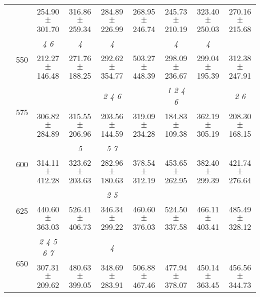 \begin{table}[h]
{\begin{tabular}{
        ccccccccc}
 & & \cellcolor[HTML]{EFEFEF} 254.90 $\pm$ 301.70& \cellcolor[HTML]{EFEFEF} 316.86 $\pm$ 259.34& \cellcolor[HTML]{EFEFEF} 284.89 $\pm$ 226.99& \cellcolor[HTML]{EFEFEF} 268.95 $\pm$ 246.74& \cellcolor[HTML]{EFEFEF} 245.73 $\pm$ 210.19& \cellcolor[HTML]{EFEFEF} 323.40 $\pm$ 250.03& \cellcolor[HTML]{EFEFEF} 270.16 $\pm$ 215.68 \\ 
 & \multirow{2}{*}{550}& \textit{ 4 6 }& \textit{ 4 }& \textit{ 4 }& & \textit{ 4 }& \textit{ 4 }&  \\ 
 & & 212.27 $\pm$ 146.48& 271.76 $\pm$ 188.25& 292.62 $\pm$ 354.77& 503.27 $\pm$ 448.39& 298.09 $\pm$ 236.67& 299.04 $\pm$ 195.39& 312.38 $\pm$ 247.91 \\ 
 & \multirow{2}{*}{575}& \cellcolor[HTML]{EFEFEF} & \cellcolor[HTML]{EFEFEF} & \cellcolor[HTML]{EFEFEF} \textit{ 2 4 6 }& \cellcolor[HTML]{EFEFEF} & \cellcolor[HTML]{EFEFEF} \textit{ 1 2 4 6 }& \cellcolor[HTML]{EFEFEF} & \cellcolor[HTML]{EFEFEF} \textit{ 2 6 } \\ 
 & & \cellcolor[HTML]{EFEFEF} 306.82 $\pm$ 284.89& \cellcolor[HTML]{EFEFEF} 315.55 $\pm$ 206.96& \cellcolor[HTML]{EFEFEF} 203.56 $\pm$ 144.59& \cellcolor[HTML]{EFEFEF} 319.09 $\pm$ 234.28& \cellcolor[HTML]{EFEFEF} 184.83 $\pm$ 109.38& \cellcolor[HTML]{EFEFEF} 362.19 $\pm$ 305.19& \cellcolor[HTML]{EFEFEF} 208.30 $\pm$ 168.15 \\ 
 & \multirow{2}{*}{600}& & \textit{ 5 }& \textit{ 5 7 }& & & &  \\ 
 & & 314.11 $\pm$ 412.28& 323.62 $\pm$ 203.63& 282.96 $\pm$ 180.63& 378.54 $\pm$ 312.19& 453.65 $\pm$ 262.95& 382.40 $\pm$ 299.39& 421.74 $\pm$ 276.64 \\ 
 & \multirow{2}{*}{625}& \cellcolor[HTML]{EFEFEF} & \cellcolor[HTML]{EFEFEF} & \cellcolor[HTML]{EFEFEF} \textit{ 2 5 }& \cellcolor[HTML]{EFEFEF} & \cellcolor[HTML]{EFEFEF} & \cellcolor[HTML]{EFEFEF} & \cellcolor[HTML]{EFEFEF}  \\ 
 & & \cellcolor[HTML]{EFEFEF} 440.60 $\pm$ 363.03& \cellcolor[HTML]{EFEFEF} 526.41 $\pm$ 406.73& \cellcolor[HTML]{EFEFEF} 346.34 $\pm$ 299.22& \cellcolor[HTML]{EFEFEF} 460.60 $\pm$ 376.03& \cellcolor[HTML]{EFEFEF} 524.50 $\pm$ 337.58& \cellcolor[HTML]{EFEFEF} 466.11 $\pm$ 403.41& \cellcolor[HTML]{EFEFEF} 485.49 $\pm$ 328.12 \\ 
 & \multirow{2}{*}{650}& \textit{ 2 4 5 6 7 }& & \textit{ 4 }& & & &  \\ 
 & & 307.31 $\pm$ 209.62& 480.63 $\pm$ 399.05& 348.69 $\pm$ 283.91& 506.88 $\pm$ 467.46& 477.94 $\pm$ 378.07& 450.14 $\pm$ 363.45& 456.56 $\pm$ 344.73 \\ \midrule 

\end{tabular}}
\end{table}
